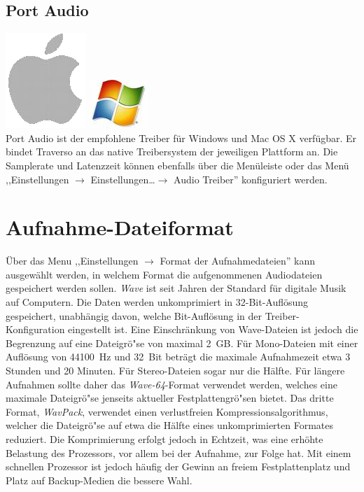\subsection{Port Audio}
\includegraphics[height=\baselineskip]{../images/mac.png}
\includegraphics[height=\baselineskip]{../images/win.png}
\\
Port Audio ist der empfohlene Treiber für Windows und Mac OS X verfügbar. Er bindet Traverso an das native Treibersystem der jeweiligen Plattform an. Die Samplerate und Latenzzeit können ebenfalls über die Menüleiste oder das Menü ,,Einstellungen $\rightarrow$ Einstellungen\dots $\rightarrow$ Audio Treiber'' konfiguriert werden.

\section{Aufnahme-Dateiformat}
Über das Menu ,,Einstellungen $\rightarrow$ Format der Aufnahmedateien'' kann ausgewählt werden, in welchem Format die aufgenommenen Audiodateien gespeichert werden sollen. \emph{Wave} ist seit Jahren der Standard für digitale Musik auf Computern. Die Daten werden unkomprimiert in 32-Bit-Auflösung gespeichert, unabhängig davon, welche Bit-Auflösung in der Treiber-Konfiguration eingestellt ist. Eine Einschränkung von Wave-Dateien ist jedoch die Begrenzung auf eine Dateigrö"se von maximal 2~GB. Für Mono-Dateien mit einer Auflösung von 44100~Hz und 32~Bit beträgt die maximale Aufnahmezeit etwa 3 Stunden und 20 Minuten. Für Stereo-Dateien sogar nur die Hälfte. Für längere Aufnahmen sollte daher das \emph{Wave-64}-Format verwendet werden, welches eine maximale Dateigrö"se jenseits aktueller Festplattengrö"sen bietet. Das dritte Format, \emph{WavPack}, verwendet einen verlustfreien Kompressionsalgorithmus, welcher die Dateigrö"se auf etwa die Hälfte eines unkomprimierten Formates reduziert. Die Komprimierung erfolgt jedoch in Echtzeit, was eine erhöhte Belastung des Prozessors, vor allem bei der Aufnahme, zur Folge hat. Mit einem schnellen Prozessor ist jedoch häufig der Gewinn an freiem Festplattenplatz und Platz auf Backup-Medien die bessere Wahl.
